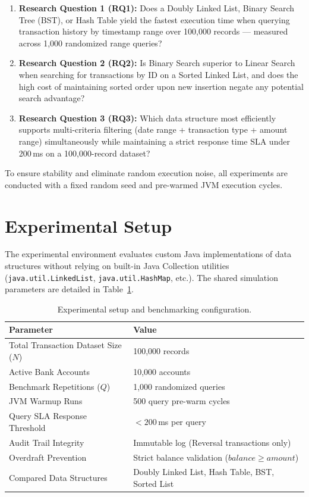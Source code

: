 \documentclass[11pt]{article}
\begin{document}
\begin{enumerate}
    \item \textbf{Research Question 1 (RQ1):} Does a Doubly Linked List, Binary Search Tree (BST), or Hash Table yield the fastest execution time when querying transaction history by timestamp range over 100,000 records --- measured across 1,000 randomized range queries?
    \item \textbf{Research Question 2 (RQ2):} Is Binary Search superior to Linear Search when searching for transactions by ID on a Sorted Linked List, and does the high cost of maintaining sorted order upon new insertion negate any potential search advantage?
    \item \textbf{Research Question 3 (RQ3):} Which data structure most efficiently supports multi-criteria filtering (date range + transaction type + amount range) simultaneously while maintaining a strict response time SLA under 200\,ms on a 100,000-record dataset?
\end{enumerate}

To ensure stability and eliminate random execution noise, all experiments are conducted with a fixed random seed and pre-warmed JVM execution cycles.

\section{Experimental Setup}
The experimental environment evaluates custom Java implementations of data structures without relying on built-in Java Collection utilities (\texttt{java.util.LinkedList}, \texttt{java.util.HashMap}, etc.). The shared simulation parameters are detailed in Table~\ref{tab:setup}.

\begin{table}[htbp]
\centering
\begin{tabular}{ll}
\toprule
\textbf{Parameter} & \textbf{Value} \\
\midrule
Total Transaction Dataset Size ($N$) & 100,000 records \\
Active Bank Accounts & 10,000 accounts \\
Benchmark Repetitions ($Q$) & 1,000 randomized queries \\
JVM Warmup Runs & 500 query pre-warm cycles \\
Query SLA Response Threshold & $< 200$\,ms per query \\
Audit Trail Integrity & Immutable log (Reversal transactions only) \\
Overdraft Prevention & Strict balance validation ($balance \ge amount$) \\
Compared Data Structures & Doubly Linked List, Hash Table, BST, Sorted List \\
\bottomrule
\end{tabular}
\caption{Experimental setup and benchmarking configuration.}
\label{tab:setup}
\end{table}
\end{document}
